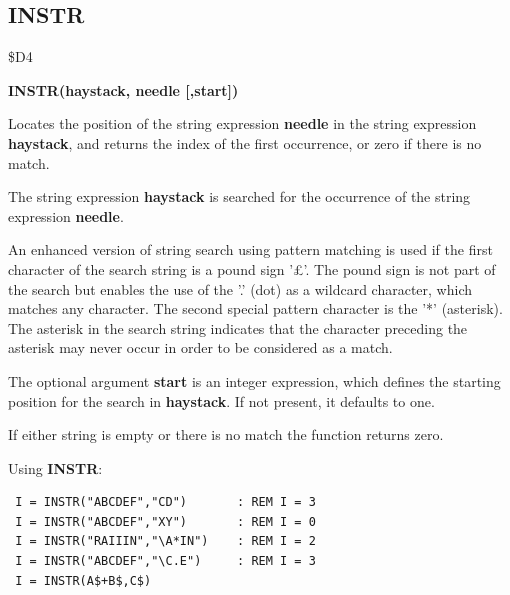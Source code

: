 \subsection{INSTR}
\begin{description}[leftmargin=2cm,style=nextline]
\item [Token:] \$D4
\item [Format:] {\bf INSTR(haystack, needle [,start])}
\item [Usage:] Locates the
               position of the string expression {\bf needle}
               in the string expression {\bf haystack}, and
               returns the index of the first occurrence,
               or zero if there is no match.

               The string expression {\bf haystack}
               is searched for the occurrence of the
               string expression
               {\bf needle}.

               An enhanced version of string search using pattern
               matching is used if the first character of
               the search string is a pound sign '£'.
               The pound sign is not part of the search but enables the use
               of the '.' (dot) as a wildcard character, which matches any
               character. The second special pattern character is
               the '*' (asterisk). The asterisk in the search string indicates
               that the character preceding the asterisk may never occur
               in order to be considered as a match.

               The optional argument {\bf start} is an integer
               expression, which defines the starting position
               for the search in {\bf haystack}. If not present,
               it defaults to one.

\item [Remarks:] If either string is empty or there is no match
               the function returns zero.

\item [Examples:] Using {\bf INSTR}:
\begin{tcolorbox}[colback=black,coltext=white]
\verbatimfont{\codefont}
\begin{verbatim}
 I = INSTR("ABCDEF","CD")       : REM I = 3
 I = INSTR("ABCDEF","XY")       : REM I = 0
 I = INSTR("RAIIIN","\A*IN")    : REM I = 2
 I = INSTR("ABCDEF","\C.E")     : REM I = 3
 I = INSTR(A$+B$,C$)
\end{verbatim}
\end{tcolorbox}
\end{description}

